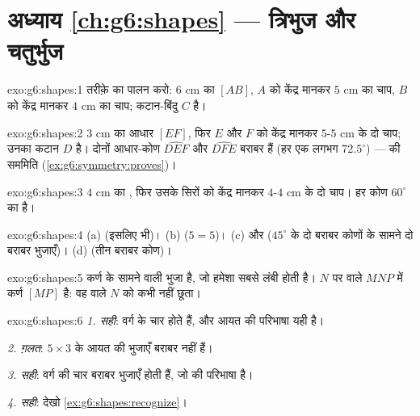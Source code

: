 \section*{अध्याय \ref{ch:g6:shapes} --- त्रिभुज और चतुर्भुज}

\begin{solution}{exo:g6:shapes:1}
तरीक़े का पालन करो: $6$ cm का  $[AB]$, $A$ को केंद्र मानकर
$5$ cm  का चाप, $B$ को केंद्र मानकर $4$ cm  का
चाप; कटान-बिंदु $C$ है।
\end{solution}

\begin{solution}{exo:g6:shapes:2}
$3$ cm का आधार $[EF]$, फिर $E$ और $F$ को केंद्र मानकर $5$-$5$ cm
 के दो चाप; उनका कटान $D$ है। दोनों आधार-कोण
$\widehat{DEF}$ और $\widehat{DFE}$ बराबर हैं (हर एक लगभग
$72.5^\circ$) ---  की सममिति (\cref{ex:g6:symmetry:proves})।
\end{solution}

\begin{solution}{exo:g6:shapes:3}
$4$ cm का , फिर उसके सिरों को केंद्र मानकर $4$-$4$ cm
 के दो चाप। हर कोण $60^\circ$ का है।
\end{solution}

\begin{solution}{exo:g6:shapes:4}
(a)  (इसलिए  भी)। \quad
(b)  ($5 = 5$)। \quad
(c)  और  ($45^\circ$ के दो बराबर कोणों के सामने
दो बराबर भुजाएँ)। \quad
(d)  (तीन बराबर कोण)।
\end{solution}

\begin{solution}{exo:g6:shapes:5}
कर्ण  के सामने वाली भुजा है, जो हमेशा सबसे लंबी होती है।
$N$ पर  वाले $MNP$ में कर्ण $[MP]$ है: वह  वाले 
$N$ को कभी नहीं छूता।
\end{solution}

\begin{solution}{exo:g6:shapes:6}
\emph{1. सही}: वर्ग के चार  होते हैं, और आयत की परिभाषा
यही है।

\emph{2. ग़लत}: $5 \times 3$ के आयत की भुजाएँ बराबर नहीं हैं।

\emph{3. सही}: वर्ग की चार बराबर भुजाएँ होती हैं, जो
 की परिभाषा है।

\emph{4. सही}: देखो \cref{ex:g6:shapes:recognize}।
\end{solution}


